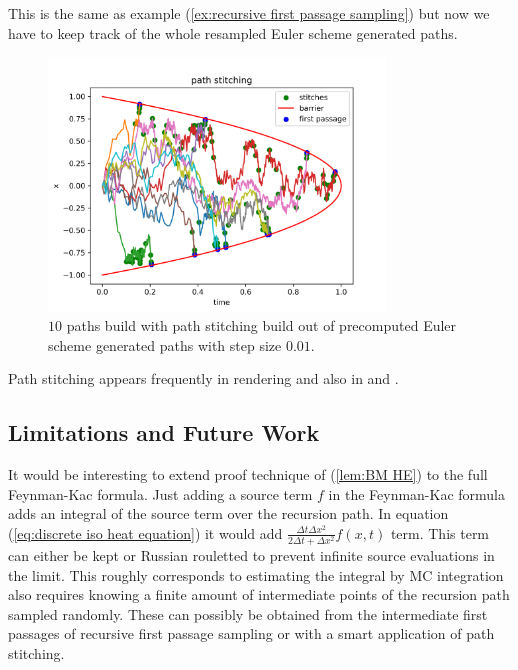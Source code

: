 \documentclass[a4paper,12pt]{article}
\begin{document}
\begin{example}
    This is the same as example (\ref{ex:recursive first passage sampling}) but now we have
    to keep track of the whole resampled Euler scheme generated paths.

    \begin{figure}[h!]
        \centering
        \includegraphics[width=0.8\textwidth]{plots/path stitching para.png}
        \caption{ $10$ paths build with path stitching build out of
            precomputed Euler scheme generated paths with step size $0.01$.}
        \label{fig:path stitching para}
    \end{figure}
\end{example}




\begin{related}
    Path stitching appears frequently in rendering and also in \cite{das_sarma_fast_2015}
    and \cite{ji_reusing_2012}.
\end{related}

\subsection{Limitations and Future Work}

It would be interesting to extend proof technique of (\ref{lem:BM HE}) to the full
Feynman-Kac formula. Just adding a source term $f$ in the Feynman-Kac formula adds
an integral of the source term over the recursion path.
In equation (\ref{eq:discrete iso heat equation})
it would add $\frac{\Delta t \Delta x^{2}}{2 \Delta t + \Delta x ^{2}} f(x,t)$
term. This term can either be kept or Russian rouletted
to prevent infinite source evaluations in the limit.
This roughly corresponds to estimating the integral by
MC integration also requires knowing a finite amount of
intermediate points of the recursion path
sampled randomly. These can possibly be obtained from
the intermediate first passages of recursive first passage sampling or with a smart
application of path stitching. \\
\end{document}
